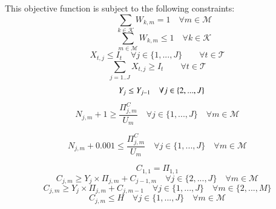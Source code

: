 \documentclass[review,12pt, 3p, times]{elsarticle}
\begin{document}
This objective function is subject to the following constraints:
	\begin{equation}
		\begin{array}{ll}		
			  &   
		\end{array}
		{{\sum_{k\in \mathcal{K}}W_{k,m}}=1 \quad \forall{ m \in  \mathcal{M}}}
		\label{c3}
	\end{equation}
	\begin{equation}
		\begin{array}{ll}
			  &   
		\end{array}
		{{\sum_{m\in \mathcal{M}}W_{k,m}}\leq 1 \quad \forall{ k \in  \mathcal{K}}}
		\label{c4}
	\end{equation}
	\begin{equation}\label{c6}
		X_{t,j}  \leq I_t  \quad\forall j \in \{1,...,J\} \quad \quad\forall{t\in\mathcal{T}}
	\end{equation} 
	\begin{equation}\label{c7}
		{{\sum_{j=1..J} X_{t,j} }   \geq I_t   \quad \quad\forall{t\in\mathcal{T}}}
	\end{equation} 
	\begin{equation}\label{c8}
		\text{\quad }  Y_j\leq Y_{j-1} \quad\forall j \in \{2,...,J\}
	\end{equation}									 
	\begin{equation}\label{c9} 
		N_{j,m} +1 \geq \frac{\Pi^C_{j,m}}{U_m}  \quad\forall j \in \{1,...,J\}  \quad\forall m\in\mathcal{M}
	\end{equation}
											
	\begin{equation}\label{c10} 
		N_{j,m}  + 0.001  \leq \frac{\Pi^C_{j,m}}{U_m}  \quad\forall j \in \{1,...,J\} \quad\forall m\in\mathcal{M}
	\end{equation}
											 
	\begin{equation}\label{c11}
		C_{1,1} = \Pi_{1,1} 
	\end{equation}	
	\begin{equation}\label{c12}
		C_{j,m} \geq Y_j\times\Pi_{j,m}+C_{j-1,m}\quad\forall j \in \{2,...,J\}\quad\forall{m\in\mathcal{M}}
	\end{equation} 
	\begin{equation}\label{c13}
		C_{j,m} \geq Y_j\times\Pi_{j,m}+C_{j,m-1}  \quad\forall j \in \{1,...,J\} \quad\forall m \in \{2, ..., M\}
	\end{equation} 			
	\begin{equation}\label{c14}
		C_{j,m} \leq H\quad\forall j \in \{1,...,J\}\quad\forall{ m \in\mathcal{M}} 
	\end{equation} 						
	
\end{document}
